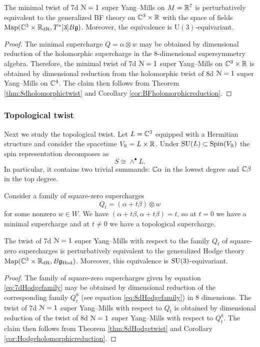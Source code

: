\documentclass[10pt, oneside]{article}
\newcommand{\Hod}{\mathrm{Hod}}
\renewcommand{\U}{\mathrm{U}}
\begin{document}
\begin{thm}
The minimal twist of 7d $\mathcal N=1$ super Yang--Mills on $M=\mathbb R^7$ is perturbatively equivalent to the generalized BF theory on $\mathbb C^3\times \mathbb R$ with the space of fields $\operatorname{Map}(\mathbb C^3\times \mathbb R_{\mathrm{dR}}, T^*[3] B\mathfrak g)$. Moreover, the equivalence is $\U(3)$-equivariant.
\label{thm:7dminimaltwist}
\end{thm}
\begin{proof}
The minimal supercharge $Q=\alpha\otimes w$ may be obtained by dimensional reduction of the holomorphic supercharge in the 8-dimensional supersymmetry algebra. Therefore, the minimal twist of 7d $\mathcal N=1$ super Yang--Mills on $\mathbb C^3\times \mathbb R$ is obtained by dimensional reduction from the holomorphic twist of 8d $\mathcal N=1$ super Yang--Mills on $\mathbb C^4$. The claim then follows from Theorem \ref{thm:8dholomorphictwist} and Corollary \ref{cor:BFholomorphicreduction}.
\end{proof}

\subsubsection{Topological twist}

Next we study the topological twist. Let $L=\mathbb C^3$ equipped with a Hermitian structure and consider the spacetime $V_\mathbb R=L\times \mathbb R$. Under $\mathrm{SU}(L)\subset \mathrm{Spin}(V_\mathbb R)$ the spin representation decomposes as
\[S\cong \wedge^\bullet L.\]
In particular, it contains two trivial summands: $\mathbb C\alpha$ in the lowest degree and $\mathbb C\beta$ in the top degree.

Consider a family of square-zero supercharges
\begin{equation}
Q_t = (\alpha + t\beta)\otimes w
\label{eq:7dHodgefamily}
\end{equation}
for some nonzero $w\in W$. We have $(\alpha + t\beta, \alpha + t\beta)=t$, so at $t=0$ we have a minimal supercharge and at $t\neq 0$ we have a topological supercharge.

\begin{thm}
The twist of 7d $\mathcal N=1$ super Yang--Mills with respect to the family $Q_t$ of square-zero supercharges is perturbatively equivalent to the generalized Hodge theory $\map(\CC^3\times \RR_{\mr{dR}}, B\fg_{\Hod})$. Moreover, this equivalence is $\mathrm{SU}(3)$-equivariant.
\label{thm:7dHodgetwist}
\end{thm}
\begin{proof}
The family of square-zero supercharges given by equation \eqref{eq:7dHodgefamily} may be obtained by dimensional reduction of the corresponding family $Q_t^8$ (see equation \eqref{eq:8dHodgefamily}) in 8 dimensions. The twist of 7d $\mathcal N=1$ super Yang--Mills with respect to $Q_t$ is obtained by dimensional reduction of the twist of 8d $\mathcal N=1$ super Yang--Mills with respect to $Q_t^8$. The claim then follows from Theorem \ref{thm:8dHodgetwist} and Corollary \ref{cor:Hodgeholomorphicreduction}.
\end{proof}
\end{document}
